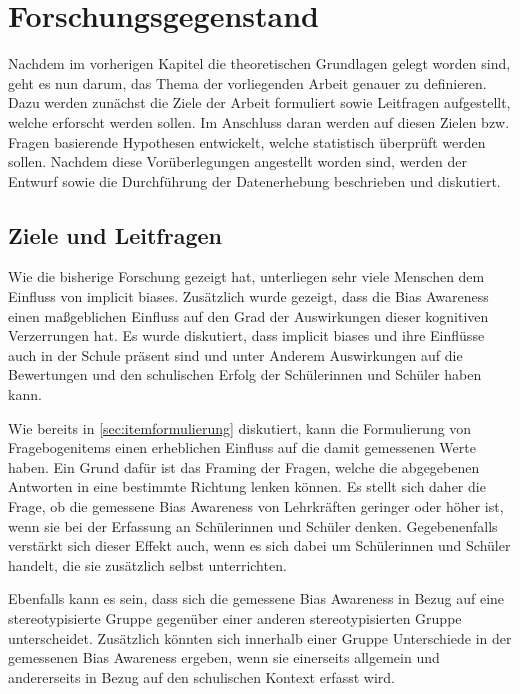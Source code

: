\chapter{Forschungsgegenstand}
\label{ch:forschungsgegenstand}

Nachdem im vorherigen Kapitel die theoretischen Grundlagen gelegt worden sind, geht es nun darum, das Thema der vorliegenden Arbeit genauer zu definieren.
Dazu werden zunächst die Ziele der Arbeit formuliert sowie Leitfragen aufgestellt, welche erforscht werden sollen.
Im Anschluss daran werden auf diesen Zielen bzw. Fragen basierende Hypothesen entwickelt, welche statistisch überprüft werden sollen.
Nachdem diese Vorüberlegungen angestellt worden sind, werden der Entwurf sowie die Durchführung der Datenerhebung beschrieben und diskutiert.


\section{Ziele und Leitfragen}
\label{sec:leitfragen}

Wie die bisherige Forschung gezeigt hat, unterliegen sehr viele Menschen dem Einfluss von implicit biases.
Zusätzlich wurde gezeigt, dass die Bias Awareness einen maßgeblichen Einfluss auf den Grad der Auswirkungen dieser kognitiven Verzerrungen hat.
Es wurde diskutiert, dass implicit biases und ihre Einflüsse auch in der Schule präsent sind und unter Anderem Auswirkungen auf die Bewertungen und den schulischen Erfolg der Schülerinnen und Schüler haben kann.

Wie bereits in \autoref{sec:itemformulierung} diskutiert, kann die Formulierung von Fragebogenitems einen erheblichen Einfluss auf die damit gemessenen Werte haben.
Ein Grund dafür ist das Framing der Fragen, welche die abgegebenen Antworten in eine bestimmte Richtung lenken können.
Es stellt sich daher die Frage, ob die gemessene Bias Awareness von Lehrkräften geringer oder höher ist, wenn sie bei der Erfassung an Schülerinnen und Schüler denken.
Gegebenenfalls verstärkt sich dieser Effekt auch, wenn es sich dabei um Schülerinnen und Schüler handelt, die sie zusätzlich selbst unterrichten.

Ebenfalls kann es sein, dass sich die gemessene Bias Awareness in Bezug auf eine stereotypisierte Gruppe gegenüber einer anderen stereotypisierten Gruppe unterscheidet.
Zusätzlich könnten sich innerhalb einer Gruppe Unterschiede in der gemessenen Bias Awareness ergeben, wenn sie einerseits allgemein und andererseits in Bezug auf den schulischen Kontext erfasst wird.


